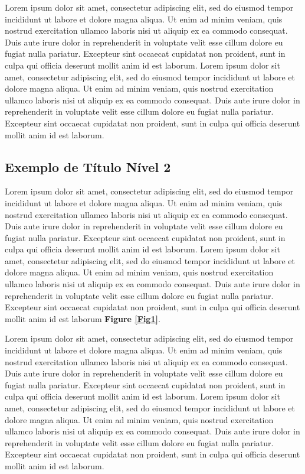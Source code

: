 \documentclass[portuguese]{sbc2025}%
\begin{document}
Lorem ipsum dolor sit amet, consectetur adipiscing elit, sed do eiusmod tempor incididunt ut labore et dolore magna aliqua. Ut enim ad minim veniam, quis nostrud exercitation ullamco laboris nisi ut aliquip ex ea commodo consequat. Duis aute irure dolor in reprehenderit in voluptate velit esse cillum dolore eu fugiat nulla pariatur. Excepteur sint occaecat cupidatat non proident, sunt in culpa qui officia deserunt mollit anim id est laborum. Lorem ipsum dolor sit amet, consectetur adipiscing elit, sed do eiusmod tempor incididunt ut labore et dolore magna aliqua. Ut enim ad minim veniam, quis nostrud exercitation ullamco laboris nisi ut aliquip ex ea commodo consequat. Duis aute irure dolor in reprehenderit in voluptate velit esse cillum dolore eu fugiat nulla pariatur. Excepteur sint occaecat cupidatat non proident, sunt in culpa qui officia deserunt mollit anim id est laborum.


\subsection{Exemplo de Título Nível 2}

Lorem ipsum dolor sit amet, consectetur adipiscing elit, sed do eiusmod tempor incididunt ut labore et dolore magna aliqua. Ut enim ad minim veniam, quis nostrud exercitation ullamco laboris nisi ut aliquip ex ea commodo consequat. Duis aute irure dolor in reprehenderit in voluptate velit esse cillum dolore eu fugiat nulla pariatur. Excepteur sint occaecat cupidatat non proident, sunt in culpa qui officia deserunt mollit anim id est laborum. Lorem ipsum dolor sit amet, consectetur adipiscing elit, sed do eiusmod tempor incididunt ut labore et dolore magna aliqua. Ut enim ad minim veniam, quis nostrud exercitation ullamco laboris nisi ut aliquip ex ea commodo consequat. Duis aute irure dolor in reprehenderit in voluptate velit esse cillum dolore eu fugiat nulla pariatur. Excepteur sint occaecat cupidatat non proident, sunt in culpa qui officia deserunt mollit anim id est laborum \textbf{Figure \ref{Fig1}}.

Lorem ipsum dolor sit amet, consectetur adipiscing elit, sed do eiusmod tempor incididunt ut labore et dolore magna aliqua. Ut enim ad minim veniam, quis nostrud exercitation ullamco laboris nisi ut aliquip ex ea commodo consequat. Duis aute irure dolor in reprehenderit in voluptate velit esse cillum dolore eu fugiat nulla pariatur. Excepteur sint occaecat cupidatat non proident, sunt in culpa qui officia deserunt mollit anim id est laborum. Lorem ipsum dolor sit amet, consectetur adipiscing elit, sed do eiusmod tempor incididunt ut labore et dolore magna aliqua. Ut enim ad minim veniam, quis nostrud exercitation ullamco laboris nisi ut aliquip ex ea commodo consequat. Duis aute irure dolor in reprehenderit in voluptate velit esse cillum dolore eu fugiat nulla pariatur. Excepteur sint occaecat cupidatat non proident, sunt in culpa qui officia deserunt mollit anim id est laborum.
\end{document}
